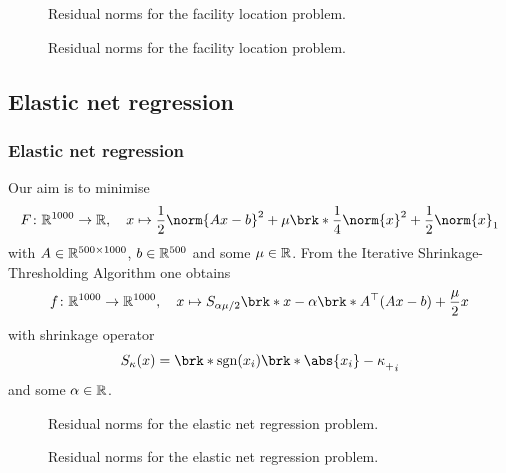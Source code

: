\begin{frame}
	\begin{figure}
		\centering
		{\scriptsize
		
		}
		\caption{Residual norms for the facility location problem.}
	\end{figure}
\end{frame}


\begin{frame}
	\begin{figure}
		\centering
		{\scriptsize
		
		}
		\caption{Residual norms for the facility location problem.}
	\end{figure}
\end{frame}

\subsection{Elastic net regression}

\begin{frame}
	\frametitle{Elastic net regression}
	Our aim is to minimise
	\begin{align*}
		F\colon \R^{1000}\to \R, \quad x\mapsto \frac{1}{2}\norm{Ax-b}^2+\mu\brk*{\frac{1}{4}\norm{x}^2+\frac{1}{2}\norm{x}_1}
	\end{align*}
	with $A\in\mathbb{R}^{500\times 1000}$, $b\in\mathbb{R}^{500}$ and some $\mu\in\mathbb{R}$. From the Iterative Shrinkage-Thresholding Algorithm one obtains
	\begin{align*}
		f\colon\R^{1000}\to\R^{1000}, \quad x\mapsto S_{\alpha\mu/2}\brk*{x-\alpha\brk*{A^\top(Ax-b)+\frac{\mu}{2}x}}
	\end{align*}
	with shrinkage operator
	\begin{align*}
		S_\kappa(x) = \brk*{\sgn(x_i)\brk*{\abs{x_i}-\kappa}_+}_i
	\end{align*}
	and some $\alpha\in\mathbb{R}$.
\end{frame}


\begin{frame}
	\begin{figure}
		\centering
		{\scriptsize
		
		}
		\caption{Residual norms for the elastic net regression problem.}
	\end{figure}
\end{frame}

\begin{frame}
	\begin{figure}
		\centering
		{\scriptsize
		
		}
		\caption{Residual norms for the elastic net regression problem.}
	\end{figure}
\end{frame}
